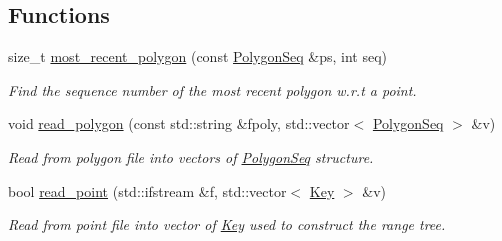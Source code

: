 \subsection*{Functions}
\begin{DoxyCompactItemize}
\item 
size\-\_\-t \hyperlink{namespaceSigSpatial2013_a317bfe5f97ff810889aab1765f916f49}{most\-\_\-recent\-\_\-polygon} (const \hyperlink{structSigSpatial2013_1_1PolygonSeq}{Polygon\-Seq} \&ps, int seq)
\begin{DoxyCompactList}\small\item\em Find the sequence number of the most recent polygon w.\-r.\-t a point. \end{DoxyCompactList}\item 
void \hyperlink{namespaceSigSpatial2013_ae6c95a87661a6bfca2decf6e7120508d}{read\-\_\-polygon} (const std\-::string \&fpoly, std\-::vector$<$ \hyperlink{structSigSpatial2013_1_1PolygonSeq}{Polygon\-Seq} $>$ \&v)
\begin{DoxyCompactList}\small\item\em Read from polygon file into vectors of \hyperlink{structSigSpatial2013_1_1PolygonSeq}{Polygon\-Seq} structure. \end{DoxyCompactList}\item 
\hypertarget{namespaceSigSpatial2013_abe57a3ac7481f0bf62658917a4d0642e}{bool \hyperlink{namespaceSigSpatial2013_abe57a3ac7481f0bf62658917a4d0642e}{read\-\_\-point} (std\-::ifstream \&f, std\-::vector$<$ \hyperlink{namespaceSigSpatial2013_af9823bd0b551eb301830d664ba571a15}{Key} $>$ \&v)}\label{namespaceSigSpatial2013_abe57a3ac7481f0bf62658917a4d0642e}

\begin{DoxyCompactList}\small\item\em Read from point file into vector of \hyperlink{namespaceSigSpatial2013_af9823bd0b551eb301830d664ba571a15}{Key} used to construct the range tree. \end{DoxyCompactList}\end{DoxyCompactItemize}
